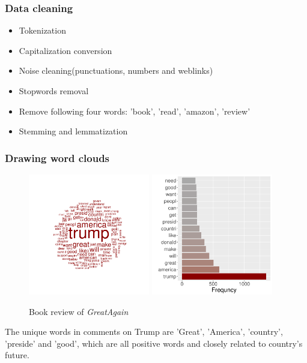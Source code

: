 \documentclass[9pt]{beamer}
\begin{document}
\begin{frame}
\frametitle{Data cleaning}
\begin{itemize}
	\item Tokenization
	\item Capitalization conversion
	\item Noise cleaning(punctuations, numbers and weblinks)
	\item Stopwords removal
	\item Remove following four words: 'book', 'read', 'amazon', 'review'
	\item Stemming and lemmatization
\end{itemize}
\end{frame}

\begin{frame}
\frametitle{Drawing word clouds}
\begin{figure}[H]
	\centering
	\includegraphics[width=150pt]{great_词云.pdf}
	\includegraphics[width=150pt,height=150pt]{great_bar.pdf}
	\caption{Book review of \textit{GreatAgain}}
\end{figure}
The unique words in comments on Trump are 'Great', 'America', 'country', 'preside' and 'good', which are all positive words and closely related to country's future.
\end{frame}
\end{document}
